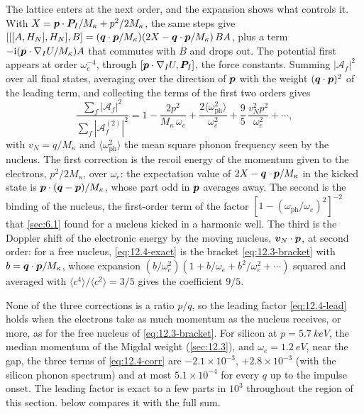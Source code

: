 The lattice enters at the next order, and the expansion shows what controls it. With $X = \bm{p}\cdot\bm{P}_I/M_\kappa + p^2/2M_\kappa$, the same steps give $[[[A,H_N],H_N],B] = (\bm{q}\cdot\bm{p}/M_\kappa)(2X - \bm{q}\cdot\bm{p}/M_\kappa)\,BA$, plus a term $-\mathrm{i}(\bm{p}\cdot\nabla_IU/M_\kappa)A$ that commutes with $B$ and drops out. The potential first appears at order $\omega_e^{-4}$, through $[\bm{p}\cdot\nabla_IU,\bm{P}_I]$, the force constants. Summing $|\mathcal{A}_f|^2$ over all final states, averaging over the direction of $\bm{p}$ with the weight $(\bm{q}\cdot\bm{p})^2$ of the leading term, and collecting the terms of the first two orders gives
\begin{equation}
  \frac{\sum_f|\mathcal{A}_f|^2}{\sum_f|\mathcal{A}^{(2)}_f|^2} = 1 - \frac{2p^2}{M_\kappa\,\omega_e} + \frac{2\langle\omega_{\mathrm{ph}}^2\rangle}{\omega_e^2} + \frac95\,\frac{v_N^2p^2}{\omega_e^2} + \cdots ,
  \label{eq:12.4-corr}
\end{equation}
with $v_N = q/M_\kappa$ and $\langle\omega_{\mathrm{ph}}^2\rangle$ the mean square phonon frequency seen by the nucleus. The first correction is the recoil energy of the momentum given to the electrons, $p^2/2M_\kappa$, over $\omega_e$: the expectation value of $2X - \bm{q}\cdot\bm{p}/M_\kappa$ in the kicked state is $\bm{p}\cdot(\bm{q} - \bm{p})/M_\kappa$, whose part odd in $\bm{p}$ averages away. The second is the binding of the nucleus, the first-order term of the factor $[1 - (\omega_{\mathrm{ph}}/\omega_e)^2]^{-2}$ that \cref{sec:6.1} found for a nucleus kicked in a harmonic well. The third is the Doppler shift of the electronic energy by the moving nucleus, $\bm{v}_N\cdot\bm{p}$, at second order: for a free nucleus, \cref{eq:12.4-exact} is the bracket \cref{eq:12.3-bracket} with $b = \bm{q}\cdot\bm{p}/M_\kappa$, whose expansion $(b/\omega_e^2)(1 + b/\omega_e + b^2/\omega_e^2 + \cdots)$ squared and averaged with $\langle c^4\rangle/\langle c^2\rangle = 3/5$ gives the coefficient $9/5$.

None of the three corrections is a ratio $p/q$, so the leading factor \cref{eq:12.4-lead} holds when the electrons take as much momentum as the nucleus receives, or more, as for the free nucleus of \cref{eq:12.3-bracket}. For silicon at $p = \SI{5.7}{keV}$, the median momentum of the Migdal weight (\cref{sec:12.3}), and $\omega_e = \SI{1.2}{eV}$, near the gap, the three terms of \cref{eq:12.4-corr} are $-2.1\times10^{-3}$, $+2.8\times10^{-3}$ (with the silicon phonon spectrum) and at most $5.1\times10^{-4}$ for every $q$ up to the impulse onset. The leading factor is exact to a few parts in $10^3$ throughout the region of this section.  below compares it with the full sum.

